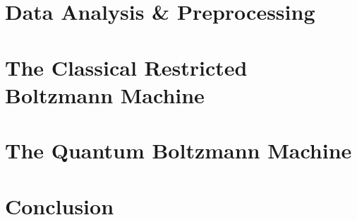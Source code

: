 \documentclass[11pt,twoside]{report}
\begin{document}
\chapter{Data Analysis \& Preprocessing}
\label{ch:data_analysis}

\newpage\thispagestyle{empty}\mbox{}\newpage
\newpage\thispagestyle{empty}\mbox{}\newpage

\chapter{The Classical Restricted Boltzmann Machine}
\label{ch:rbm}


\chapter{The Quantum Boltzmann Machine}
\label{ch:qbm}


\chapter{Conclusion}
\label{ch:conclusion}


\appendix
\begin{appendices}
\label{ch:appendix}

\end{appendices}

\printbibliography
\end{document}
